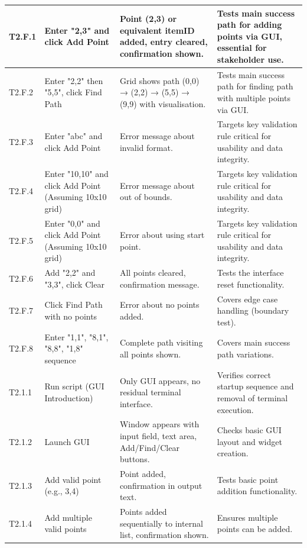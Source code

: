 \begin{longtable}{|p{}|p{}|p{}|p{}|}
	T2.F.1 & Enter "2,3" and click Add Point & Point (2,3) or equivalent itemID added, entry cleared, confirmation shown. & Tests main success path for adding points via GUI, essential for stakeholder use. \\
	\hline
	T2.F.2 & Enter "2,2" then "5,5", click Find Path & Grid shows path (0,0) → (2,2) → (5,5) → (9,9) with visualisation. & Tests main success path for finding path with multiple points via GUI. \\
	\hline
	T2.F.3 & Enter "abc" and click Add Point & Error message about invalid format. & Targets key validation rule critical for usability and data integrity. \\
	\hline
	T2.F.4 & Enter "10,10" and click Add Point (Assuming 10x10 grid) & Error message about out of bounds. & Targets key validation rule critical for usability and data integrity. \\
	\hline
	T2.F.5 & Enter "0,0" and click Add Point (Assuming 10x10 grid) & Error about using start point. & Targets key validation rule critical for usability and data integrity. \\
	\hline
	T2.F.6 & Add "2,2" and "3,3", click Clear & All points cleared, confirmation message. & Tests the interface reset functionality. \\
	\hline
	T2.F.7 & Click Find Path with no points & Error about no points added. & Covers edge case handling (boundary test). \\
	\hline
	T2.F.8 & Enter "1,1", "8,1", "8,8", "1,8" sequence & Complete path visiting all points shown. & Covers main success path variations. \\
	\hline
	T2.1.1 & Run script (GUI Introduction) & Only GUI appears, no residual terminal interface. & Verifies correct startup sequence and removal of terminal execution. \\
	\hline
	T2.1.2 & Launch GUI & Window appears with input field, text area, Add/Find/Clear buttons. & Checks basic GUI layout and widget creation. \\
	\hline
	T2.1.3 & Add valid point (e.g., 3,4) & Point added, confirmation in output text. & Tests basic point addition functionality. \\
	\hline
	T2.1.4 & Add multiple valid points & Points added sequentially to internal list, confirmation shown. & Ensures multiple points can be added. \\

\end{longtable}
